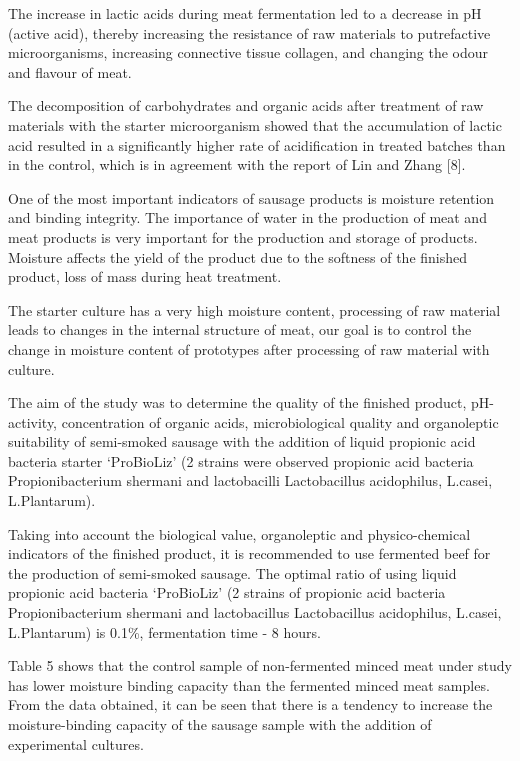 The increase in lactic acids during meat fermentation led to a decrease
in pH (active acid), thereby increasing the resistance of raw materials
to putrefactive microorganisms, increasing connective tissue collagen,
and changing the odour and flavour of meat.

The decomposition of carbohydrates and organic acids after treatment of
raw materials with the starter microorganism showed that the
accumulation of lactic acid resulted in a significantly higher rate of
acidification in treated batches than in the control, which is in
agreement with the report of Lin and Zhang {[}8{]}.

One of the most important indicators of sausage products is moisture
retention and binding integrity. The importance of water in the
production of meat and meat products is very important for the
production and storage of products. Moisture affects the yield of the
product due to the softness of the finished product, loss of mass during
heat treatment.

The starter culture has a very high moisture content, processing of raw
material leads to changes in the internal structure of meat, our goal is
to control the change in moisture content of prototypes after processing
of raw material with culture.

The aim of the study was to determine the quality of the finished
product, pH-activity, concentration of organic acids, microbiological
quality and organoleptic suitability of semi-smoked sausage with the
addition of liquid propionic acid bacteria starter `ProBioLiz' (2
strains were observed propionic acid bacteria Propionibacterium shermani
and lactobacilli Lactobacillus acidophilus, L.casei, L.Plantarum).

Taking into account the biological value, organoleptic and
physico-chemical indicators of the finished product, it is recommended
to use fermented beef for the production of semi-smoked sausage. The
optimal ratio of using liquid propionic acid bacteria `ProBioLiz' (2
strains of propionic acid bacteria Propionibacterium shermani and
lactobacillus Lactobacillus acidophilus, L.casei, L.Plantarum) is 0.1\%,
fermentation time - 8 hours.

Table 5 shows that the control sample of non-fermented minced meat under
study has lower moisture binding capacity than the fermented minced meat
samples. From the data obtained, it can be seen that there is a tendency
to increase the moisture-binding capacity of the sausage sample with the
addition of experimental cultures.

